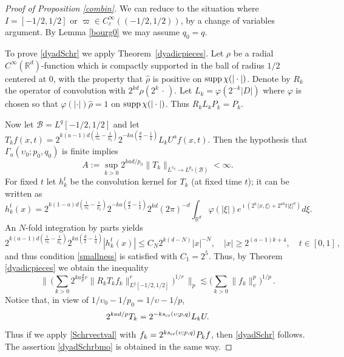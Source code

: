 \documentclass[11pt]{amsart}
\theoremstyle{definition}
\numberwithin{theorem}{section}
\numberwithin{definition}{section}
\renewcommand{\wp}{\upsilon}
\def\scr{{s_{{\text{\rm cr}}}}}
\def\im{\imath}
\def\inn#1#2{\langle#1,#2\rangle}
\newcommand{\Be}{\begin{equation}}
\newcommand{\Ee}{\end{equation}}
\newcommand{\R}{\mathbb{R}}
\newcommand{\note}[1]{\footnote{\texttt{\Small #1}}}
\def\R{\mathbb R}
\def\sB{{\mathscr{B}}}
\def\supp{{\text{\rm supp}\,}}
\def\inn#1#2{\langle#1,#2\rangle}
\def\lc{\lesssim}
\def\bbR{{\mathbb {R}}}
\begin{document}
\begin{proof}[Proof of Proposition
\ref{combin}]
 We can reduce to the situation where
$I=[-1/2,1/2]$ or $\varpi\in C^\infty_c((-1/2,1/2))$, by a
change of variables argument.
By Lemma
\ref{bourg0} we may assume $q_0=q$.

To  prove \eqref{dyadSchr} we
 apply Theorem~\ref{dyadicpieces}.
Let $\rho$ be a radial $C^\infty(\R^d)$-function which is compactly supported in the
 ball of  radius $1/2$ centered at $0$, with the property that $\widehat \rho$
is positive on $\supp \chi(|\cdot|)$. Denote by $R_k$ the operator of convolution with $2^{kd}\rho (2^k\,\cdot\,)$.
Let $L_k=  \varphi(2^{-k}|D|)$ where
$\varphi$ is chosen so that $\varphi(|\cdot|)\widehat \rho  =1$ on $\supp
\chi(|\cdot|)$.
Thus $R_kL_k P_k=P_k$.

Now let $\sB= L^q[-1/2,1/2]$
and let
$T_k f(x,t)= 2^{k(a-1)d(\frac 1{\wp_0}-\frac 1{p_0})}
2^{-ka(\frac d2-\frac 1q)} L_kU^a f(x,t)$.
Then the hypothesis that $\Gamma_a(\wp_0;p_0,q_0)$ is finite
implies
$$A:=\sup_{k>0} 2^{k ad/{p_0}}\|T_k\|_{L^{\wp_0}\to L^{p_0}(\sB)}<\infty.$$
For fixed $t$ let $h_k^t$ be the convolution kernel for $T_k$ (at fixed time $t$); it can be written as
\begin{equation*}
h^t_k(x)=
2^{k(1-a)d(\frac 1{\wp_0}-\frac 1{p_0})}
2^{-ka(\frac d2-\frac 1q)} 2^{kd} (2\pi)^{-d} \int_{\bbR^d} \varphi(|\xi|)
e^{\im(2^k \inn x\xi+2^{a k}t|\xi|^a)} d\xi.
\end{equation*}
An $N$-fold integration by parts yields
\begin{equation*}
2^{k(a-1)d(\frac 1{\wp_0}-\frac 1{p_0})} 2^{ka(\frac d2-\frac 1q)}
|h^t_k(x)|\le C_{N} 2^{k(d-N)}|x|^{-N},\quad |x|\ge  2^{(a-1)k+4},
\quad t\in [0,1]\,,
\end{equation*}
and thus condition  \eqref{smallness} is satisfied with $C_1= 2^5$.
 Thus, by Theorem
\ref{dyadicpieces}  we obtain the inequality \Be\label{Schrvectval}
\Big\|\,\Big( \sum_{k>0} 2^{k a\frac dp r} \|R_k{T}_{k}
f_{k}\|_{L^q[-1/2,1/2]}^r\Big)^{1/r}
 \,\Big\|_{p} \lc
\Big(\sum_{k>0} \|
f_{k}\|_{\wp}^p\Big)^{1/p}\,.
\Ee
Notice that, in view of $1/\wp_0-1/p_0=1/\wp-1/p$,
$$2^{kad/p} T_k= 2^{-k\scr(\wp;p,q)} L_kU.$$
Thus if we apply \eqref{Schrvectval}
with
$f_k=2^{k\scr(\wp;p,q)} P_k f$,
 then \eqref{dyadSchr}
follows.
 The assertion \eqref{dyadSchrbmo} is obtained in the same way.



\end{proof}
\end{document}
